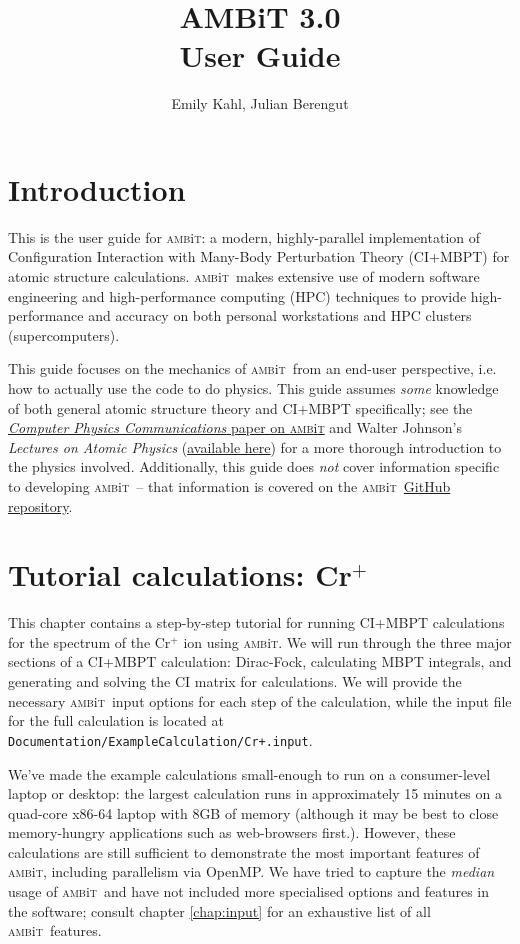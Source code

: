 \documentclass{report}
\newcommand{\ambit}{\textsc{amb}{\footnotesize i}\textsc{t}}
\begin{document}
\title{AMBiT 3.0\\User Guide}
\author{Emily Kahl, Julian Berengut}
\date{}
\maketitle

\tableofcontents

\chapter{Introduction}
This is the user guide for \ambit: a modern, highly-parallel implementation of Configuration Interaction
with Many-Body Perturbation Theory (CI+MBPT) for atomic structure calculations. \ambit\ makes extensive 
use of modern software engineering and high-performance computing (HPC) techniques to provide 
high-performance and accuracy on both personal workstations and HPC clusters (supercomputers).

This guide focuses on the mechanics of \ambit\ from an end-user perspective, i.e. how to actually use the
code to do physics. This guide assumes \emph{some} knowledge of both general atomic structure theory and
CI+MBPT specifically; see the \href{link_goes_here}{\textit{Computer Physics Communications} paper on 
\ambit} and Walter Johnson's \textit{Lectures on Atomic Physics} 
(\href{https://www3.nd.edu/~johnson/Publications/book.pdf}{available here}) for a more thorough 
introduction to the physics involved. Additionally, this guide does \emph{not} cover information 
specific to developing \ambit\ -- that information is covered on the \ambit\  
\href{https://github.com/drjuls/AMBiT}{GitHub repository}.

\chapter{Tutorial calculations: Cr$^+$}

This chapter contains a step-by-step tutorial for running CI+MBPT calculations for the spectrum of the
Cr$^+$ ion using \ambit. We will run through the three major sections of a CI+MBPT calculation:
Dirac-Fock, calculating MBPT integrals, and generating and solving the CI matrix for calculations. We
will provide the necessary \ambit\  input options for each step of the calculation, while the input file
for the full calculation is located at \texttt{Documentation/ExampleCalculation/Cr+.input}.

We've made the example calculations small-enough to run on a consumer-level laptop or desktop: the
largest calculation runs in approximately 15 minutes on a quad-core x86-64 laptop with 8GB of
memory (although it may be best to close memory-hungry applications such as web-browsers
first.). However, these calculations are still sufficient to demonstrate the most important features of 
\ambit, including parallelism via OpenMP. We have tried to capture the \textit{median} usage of \ambit\ 
and have not included more specialised options and features in the software; consult chapter
\ref{chap:input} for an exhaustive list of all \ambit\  features.
\end{document}
